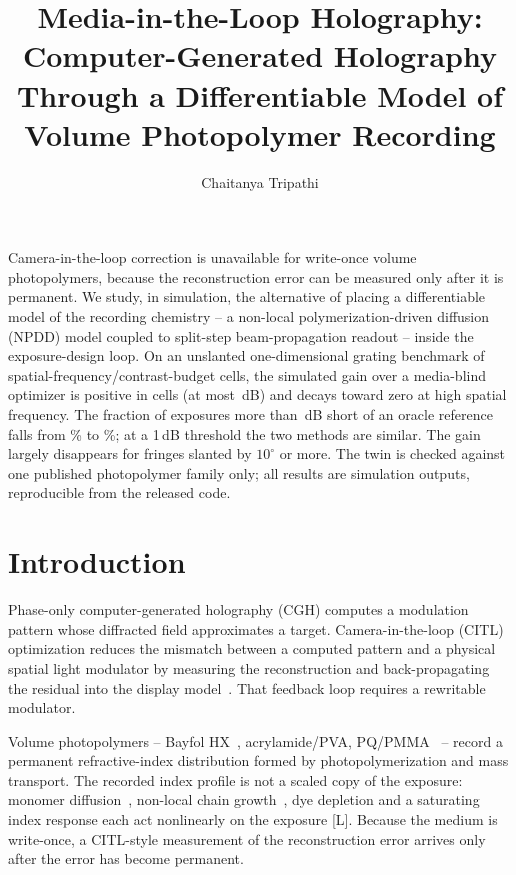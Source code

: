\documentclass{optica-article}
\begin{document}
\title{Media-in-the-Loop Holography: Computer-Generated Holography\\
Through a Differentiable Model of Volume Photopolymer Recording}

\author{Chaitanya Tripathi}

\address{Ashoka University, Sonipat, India}


\begin{abstract*}
Camera-in-the-loop correction is unavailable for write-once volume
photopolymers, because the reconstruction error can be measured only after
it is permanent. We study, in simulation, the alternative of placing a
differentiable model of the recording chemistry -- a non-local
polymerization-driven diffusion (NPDD) model coupled to split-step
beam-propagation readout -- inside the exposure-design loop. On an
unslanted one-dimensional grating benchmark of \MOneNCells{}
spatial-frequency/contrast-budget cells, the simulated gain over a
media-blind optimizer is positive in \MOneNPositive{} cells (at most
\MaxGainEightX{}\,dB) and decays toward zero at high spatial frequency. The
fraction of exposures more than \WastedMediaThreshDB\,dB short of an oracle
reference falls from \WastedMediaBSGDFrac\% to \WastedMediaMILFrac\%; at a
1\,dB threshold the two methods are similar. The gain largely disappears
for fringes slanted by $10^\circ$ or more. The twin is checked against one
published photopolymer family only; all results are simulation outputs,
reproducible from the released code.
\end{abstract*}

\section{Introduction}
Phase-only computer-generated holography (CGH) computes a modulation
pattern whose diffracted field approximates a target. Camera-in-the-loop
(CITL) optimization reduces the mismatch between a computed pattern and a
physical spatial light modulator by measuring the reconstruction and
back-propagating the residual into the display model~\cite{peng2020neural}.
That feedback loop requires a rewritable modulator.

Volume photopolymers -- Bayfol HX~\cite{bruder2017bayfol},
acrylamide/PVA, PQ/PMMA~\cite{hsieh2022pqpmma} -- record a permanent
refractive-index distribution formed by photopolymerization and mass
transport. The recorded index profile is not a scaled copy of the exposure:
monomer diffusion~\cite{zhao1994diffusion,sheridan2012reply}, non-local
chain growth~\cite{sheridan2000nonlocal,gleeson2008chain}, dye depletion
and a saturating index response each act nonlinearly on the exposure
[L]. Because the medium is write-once, a CITL-style measurement of the
reconstruction error arrives only after the error has become permanent.
\end{document}
